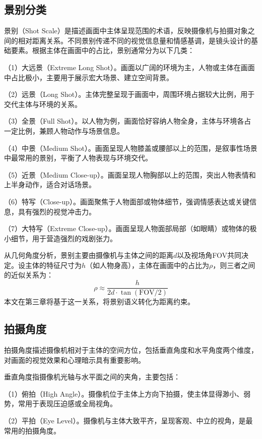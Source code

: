 \subsection{景别分类}

景别（Shot Scale）是描述画面中主体呈现范围的术语，反映摄像机与拍摄对象之间的相对距离关系\cite{rao2020unified}。不同景别传递不同的视觉信息量和情感基调，是镜头设计的基础要素。根据主体在画面中的占比，景别通常分为以下几类：

（1）大远景（Extreme Long Shot）。画面以广阔的环境为主，人物或主体在画面中占比极小，主要用于展示宏大场景、建立空间背景。

（2）远景（Long Shot）。主体完整呈现于画面中，周围环境占据较大比例，用于交代主体与环境的关系。

（3）全景（Full Shot）。以人物为例，画面恰好容纳人物全身，主体与环境各占一定比例，兼顾人物动作与场景信息。

（4）中景（Medium Shot）。画面呈现人物膝盖或腰部以上的范围，是叙事性场景中最常用的景别，平衡了人物表现与环境交代。

（5）近景（Medium Close-up）。画面呈现人物胸部以上的范围，突出人物表情和上半身动作，适合对话场景。

（6）特写（Close-up）。画面聚焦于人物面部或物体细节，强调情感表达或关键信息，具有强烈的视觉冲击力。

（7）大特写（Extreme Close-up）。画面呈现人物面部局部（如眼睛）或物体的极小细节，用于营造强烈的戏剧张力。

从几何角度分析，景别主要由摄像机与主体之间的距离$d$以及视场角FOV共同决定。设主体的特征尺寸为$h$（如人物身高），主体在画面中的占比为$\rho$，则三者之间的近似关系为：
\begin{equation}
\rho \approx \frac{h}{2d \cdot \tan(\text{FOV}/2)}
\end{equation}
本文在第三章将基于这一关系，将景别语义转化为距离约束。

\subsection{拍摄角度}

拍摄角度描述摄像机相对于主体的空间方位，包括垂直角度和水平角度两个维度，对画面的视觉效果和心理暗示具有重要影响。

垂直角度指摄像机光轴与水平面之间的夹角，主要包括：

（1）俯拍（High Angle）。摄像机位于主体上方向下拍摄，使主体显得渺小、弱势，常用于表现压迫感或全局视角。

（2）平拍（Eye Level）。摄像机与主体大致平齐，呈现客观、中立的视角，是最常用的拍摄角度。

